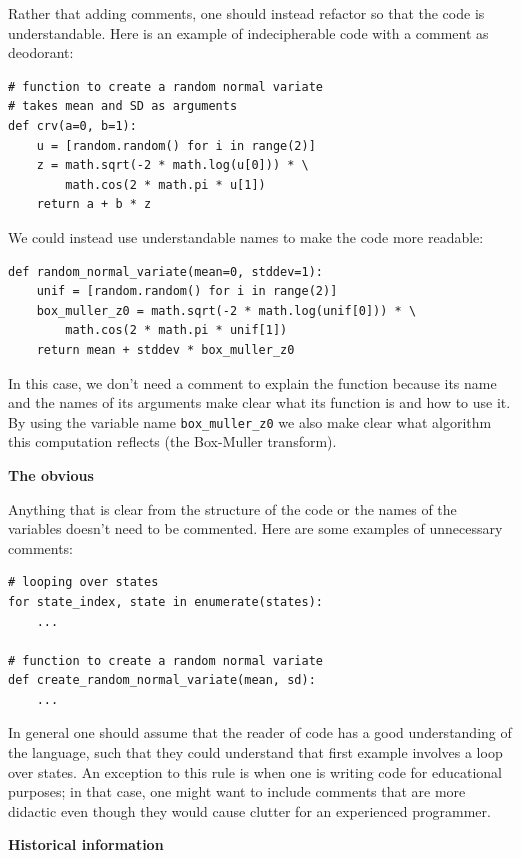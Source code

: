 Rather that adding comments, one should instead refactor so that the code is understandable.  Here is an example of indecipherable code with a comment as deodorant:

\begin{lstlisting}[style=Python]
# function to create a random normal variate
# takes mean and SD as arguments
def crv(a=0, b=1):
    u = [random.random() for i in range(2)]
    z = math.sqrt(-2 * math.log(u[0])) * \
        math.cos(2 * math.pi * u[1])
    return a + b * z
\end{lstlisting}

We could instead use understandable names to make the code more readable:

\begin{lstlisting}[style=Python]
def random_normal_variate(mean=0, stddev=1):
    unif = [random.random() for i in range(2)]
    box_muller_z0 = math.sqrt(-2 * math.log(unif[0])) * \
        math.cos(2 * math.pi * unif[1])
    return mean + stddev * box_muller_z0
\end{lstlisting}

In this case, we don't need a comment to explain the function because its name and the names of its arguments make clear what its function is and how to use it.
By using the variable name \texttt{box\_muller\_z0} we also make clear what algorithm this computation reflects (the Box-Muller transform).

\textbf{The obvious}

Anything that is clear from the structure of the code or the names of the variables doesn't need to be commented.
Here are some examples of unnecessary comments:

\begin{lstlisting}[style=Python]
# looping over states
for state_index, state in enumerate(states):
    ...

# function to create a random normal variate
def create_random_normal_variate(mean, sd):
    ...
\end{lstlisting}

In general one should assume that the reader of code has a good understanding of the language, such that they could understand that first example involves a loop over states.
An exception to this rule is when one is writing code for educational purposes; in that case, one might want to include comments that are more didactic even though they would cause clutter for an experienced programmer.

\textbf{Historical information}

